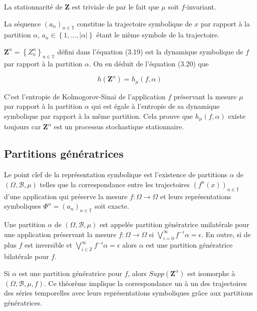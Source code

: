 La stationnarité de $\textbf{Z}$ est triviale de par le fait que $\mu$ soit $f$-invariant.

\vspace{2ex}
La séquence $(a_n)_{n\in\mathbb{T}}$ constitue la trajectoire symbolique de $x$ par rapport à la partition $\alpha$, $a_n \in \left\{1,...,|\alpha|\right\}$ étant le nième symbole de la trajectoire.

\vspace{2ex}
$\textbf{Z}^{\alpha}=\left\{Z_n^{\alpha}\right\}_{n\in\mathbb{T}}$ défini dans l'équation (3.19) est la dynamique symbolique de $f$ par rapport à la partition $\alpha$. On en déduit de l'équation (3.20) que

\begin{equation}
    h(\textbf{Z}^{\alpha})=h_{\mu}(f,\alpha)
\end{equation}

C'est l'entropie de Kolmogorov-Sinai de l'application $f$ préservant la mesure $\mu$ par rapport à la partition $\alpha$ qui est égale à l'entropie de sa dynamique symbolique par rapport à la même partition. Cela prouve que $h_{\mu}(f,\alpha)$ existe toujours car $\mathbf{Z}^{\alpha}$ est un processus stochastique stationnaire.

\subsection*{Partitions génératrices}

Le point clef de la représentation symbolique est l'existence de partitions $\alpha$ de $(\Omega, \mathcal{B},\mu)$ telles que la correspondance entre les trajectoires $(f^n(x))_{n\in\mathbb{T}}$ d'une application qui préserve la mesure $f:\Omega\longrightarrow\Omega$ et leurs représentations symboliques $\Phi^{\alpha}=(a_n)_{n\in\mathbb{T}}$ soit exacte.

\vspace{2ex}
Une partition $\alpha$ de $(\Omega, \mathcal{B},\mu)$ est appelée partition génératrice unilatérale pour une application préservant la mesure $f : \Omega \longrightarrow \Omega$ si $\bigvee_{i=0}^{\infty}f^{-i}\alpha=\epsilon$. En outre, si de plus $f$ est inversible et $\bigvee_{i\in\mathbb{Z}}^{\infty}f^{-i}\alpha=\epsilon$ alors $\alpha$ est une partition génératrice bilatérale pour $f$.

\vspace{2ex}
Si $\alpha$ est une partition génératrice pour $f$, alors $Supp(\mathbf{Z}^{\alpha})$ est isomorphe à $(\Omega, \mathcal{B},\mu,f)$. Ce théorème implique la correspondance un à un des trajectoires des séries temporelles avec leurs représentations symboliques grâce aux partitions génératrices.

